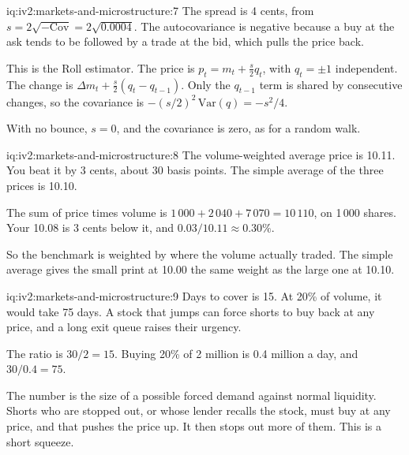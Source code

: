 \begin{solution}{iq:iv2:markets-and-microstructure:7}
The spread is 4 cents, from $s = 2\sqrt{-\mathrm{Cov}} = 2\sqrt{0.0004}$. The autocovariance is negative because a buy at the ask tends to be followed by a trade at the bid, which pulls the price back.

This is the Roll estimator. The price is $p_t = m_t + \tfrac{s}{2}q_t$, with $q_t = \pm1$ independent. The change is $\Delta m_t + \tfrac{s}{2}(q_t - q_{t-1})$. Only the $q_{t-1}$ term is shared by consecutive changes, so the covariance is $-(s/2)^2\,\mathrm{Var}(q) = -s^2/4$.

With no bounce, $s = 0$, and the covariance is zero, as for a random walk.

\end{solution}

\begin{solution}{iq:iv2:markets-and-microstructure:8}
The volume-weighted average price is 10.11. You beat it by 3 cents, about 30 basis points. The simple average of the three prices is 10.10.

The sum of price times volume is $1\,000 + 2\,040 + 7\,070 = 10\,110$, on 1\,000 shares. Your 10.08 is 3 cents below it, and $0.03/10.11 \approx 0.30\%$.

So the benchmark is weighted by where the volume actually traded. The simple average gives the small print at 10.00 the same weight as the large one at 10.10.

\end{solution}

\begin{solution}{iq:iv2:markets-and-microstructure:9}
Days to cover is 15. At 20\% of volume, it would take 75 days. A stock that jumps can force shorts to buy back at any price, and a long exit queue raises their urgency.

The ratio is $30/2 = 15$. Buying 20\% of 2 million is 0.4 million a day, and $30/0.4 = 75$.

The number is the size of a possible forced demand against normal liquidity. Shorts who are stopped out, or whose lender recalls the stock, must buy at any price, and that pushes the price up. It then stops out more of them. This is a short squeeze.

\end{solution}

